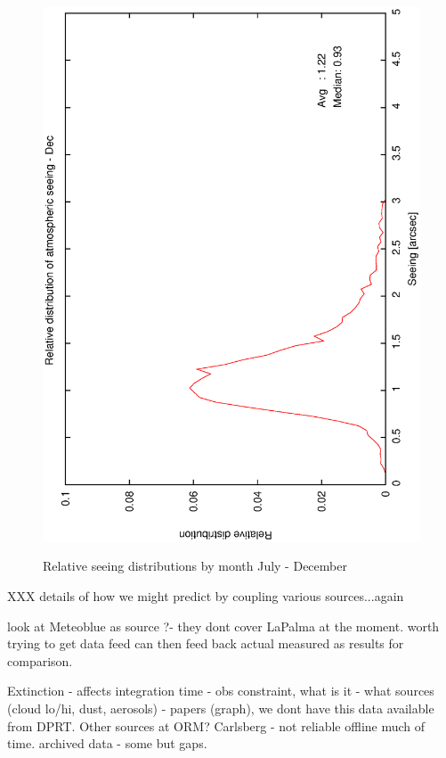 {{\begin{figure}[htbp]
\begin{center}
{   \includegraphics[scale=0.25, angle=-90]{figures/ecs/corr_see_dist_dec.eps}
  }
 \end{center}
 \caption{Relative seeing distributions by month July - December}
\label{fig:see_dist_juldec}
\end{figure}




XXX details of how we might predict by coupling various sources...again

look at Meteoblue as source ?- they dont cover LaPalma at the moment.
 worth trying to get data feed can then feed back actual measured as results for comparison.

Extinction - affects integration time - obs constraint, what is it - what sources (cloud lo/hi, dust, aerosols) - papers (graph), we dont have this data available from DPRT. Other sources at ORM? Carlsberg - not reliable offline much of time. archived data - some but gaps. 

}}

